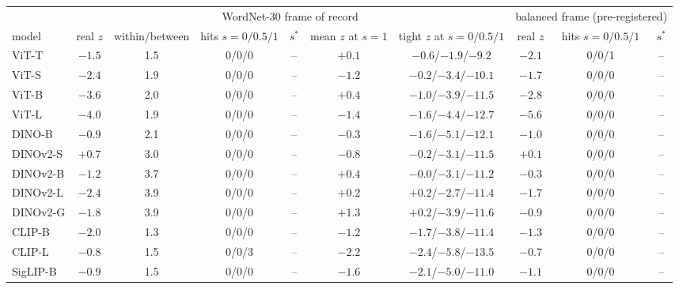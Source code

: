 \begin{table}[H]
\centering
\scriptsize
\setlength{\tabcolsep}{2pt}
\begin{tabular}{lcccccc|ccc}
\toprule
 & \multicolumn{6}{c|}{WordNet-30 frame of record} & \multicolumn{3}{c}{balanced frame (pre-registered)} \\
model & real $z$ & within/between & hits $s{=}0/0.5/1$ & $s^*$ & mean $z$ at $s{=}1$ & tight $z$ at $s{=}0/0.5/1$ & real $z$ & hits $s{=}0/0.5/1$ & $s^*$ \\
\midrule
ViT-T & $-1.5$ & 1.5 & 0/0/0 & -- & $+0.1$ & $-0.6$/$-1.9$/$-9.2$ & $-2.1$ & 0/0/1 & -- \\
ViT-S & $-2.4$ & 1.9 & 0/0/0 & -- & $-1.2$ & $-0.2$/$-3.4$/$-10.1$ & $-1.7$ & 0/0/0 & -- \\
ViT-B & $-3.6$ & 2.0 & 0/0/0 & -- & $+0.4$ & $-1.0$/$-3.9$/$-11.5$ & $-2.8$ & 0/0/0 & -- \\
ViT-L & $-4.0$ & 1.9 & 0/0/0 & -- & $-1.4$ & $-1.6$/$-4.4$/$-12.7$ & $-5.6$ & 0/0/0 & -- \\
\midrule
DINO-B & $-0.9$ & 2.1 & 0/0/0 & -- & $-0.3$ & $-1.6$/$-5.1$/$-12.1$ & $-1.0$ & 0/0/0 & -- \\
DINOv2-S & $+0.7$ & 3.0 & 0/0/0 & -- & $-0.8$ & $-0.2$/$-3.1$/$-11.5$ & $+0.1$ & 0/0/0 & -- \\
DINOv2-B & $-1.2$ & 3.7 & 0/0/0 & -- & $+0.4$ & $-0.0$/$-3.1$/$-11.2$ & $-0.3$ & 0/0/0 & -- \\
DINOv2-L & $-2.4$ & 3.9 & 0/0/0 & -- & $+0.2$ & $+0.2$/$-2.7$/$-11.4$ & $-1.7$ & 0/0/0 & -- \\
DINOv2-G & $-1.8$ & 3.9 & 0/0/0 & -- & $+1.3$ & $+0.2$/$-3.9$/$-11.6$ & $-0.9$ & 0/0/0 & -- \\
\midrule
CLIP-B & $-2.0$ & 1.3 & 0/0/0 & -- & $-1.2$ & $-1.7$/$-3.8$/$-11.4$ & $-1.3$ & 0/0/0 & -- \\
CLIP-L & $-0.8$ & 1.5 & 0/0/3 & -- & $-2.2$ & $-2.4$/$-5.8$/$-13.5$ & $-0.7$ & 0/0/0 & -- \\
SigLIP-B & $-0.9$ & 1.5 & 0/0/0 & -- & $-1.6$ & $-2.1$/$-5.0$/$-11.0$ & $-1.1$ & 0/0/0 & -- \\
\bottomrule
\end{tabular}

\end{table}
